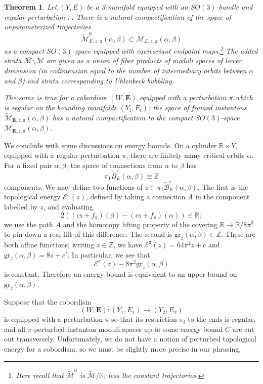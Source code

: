 \documentclass[10pt,a4paper]{amsart}
\newtheorem{theorem}{Theorem}
\theoremstyle{definition}
\theoremstyle{remark}
\numberwithin{figure}{qchap}
\begin{document}
\begin{theorem}\label{comp}Let $(Y,E)$ be a 3-manifold equipped with an $SO(3)$-bundle and regular perturbation $\pi$. There is a natural compactification of the space of unparameterized trajectories $$\widetilde{\mathcal M}^0_{E,z,\pi}(\alpha,\beta) \subset \overline{\mathcal M}_{E,z,\pi}(\alpha,\beta)$$ as a compact $SO(3)$-space equipped with equivariant endpoint maps.\footnote{Here recall that $\widetilde{\mathcal M}^0$ is $\widetilde{\mathcal M}/\mathbb R$, less the constant trajectories.} The added strata $\overline{\mathcal M} \setminus \widetilde{\mathcal M}$ are given as a union of fiber products of moduli spaces of lower dimension (in codimension equal to the number of intermediary orbits between $\alpha$ and $\beta$) and strata corresponding to Uhlenbeck bubbling.

The same is true for a cobordism $(W,\mathbf{E})$ equipped with a perturbation $\pi$ which is regular on the bounding manifolds $(Y_i, E_i)$: the space of framed instantons $\widetilde{\mathcal M}_{\mathbf{E},z,\pi}(\alpha, \beta)$ has a natural compactification to the compact $SO(3)$-space $\overline{\mathcal M}_{\mathbf{E},z,\pi}(\alpha, \beta)$.
\end{theorem}

We conclude with some discussions on energy bounds. On a cylinder $\mathbb R \times Y$, equipped with a regular perturbation $\pi$, there are finitely many critical orbits $\alpha$. For a fixed pair $\alpha, \beta$, the space of connections from $\alpha$ to $\beta$ has
$$\pi_1 \widetilde B^e_E(\alpha, \beta) \cong \mathbb Z$$
components. We may define two functions of $z \in \pi_1 \widetilde{\mathcal B}^e_E(\alpha, \beta)$. The first is the topological energy $\mathcal E^\pi(z)$, defined by taking a connection $A$ in the component labelled by $z$, and evaluating $$2\left((\text{cs}+f_\pi)(\beta)-(\text{cs}+f_\pi)(\alpha)\right) \in \mathbb R;$$ we use the path $A$ and the homotopy lifting property of the covering $\mathbb R \to \mathbb R/8\pi^2$ to pin down a real lift of this difference. The second is $\text{gr}_z(\alpha, \beta) \in \mathbb Z$. These are both affine functions; writing $z \in \mathbb Z$, we have $\mathcal E^\pi(z) = 64\pi^2 z + c$ and $\text{gr}_z(\alpha, \beta) = 8z + c'$. In particular, we see that
$$\mathcal E^\pi(z) - 8\pi^2\text{gr}_z(\alpha, \beta)$$
is constant. Therefore an energy bound is equivalent to an upper bound on $\text{gr}_z(\alpha, \beta)$.

Suppose that the cobordism
$$(W,\mathbf{E}): (Y_1, E_1) \to (Y_2, E_2)$$
is equipped with a perturbation $\pi$ so that its restriction $\pi_i$ to the ends is regular, and all $\pi$-perturbed instanton moduli spaces up to some energy bound $C$ are cut out transversely. Unfortunately, we do not have a notion of perturbed topological energy for a cobordism, so we must be slightly more precise in our phrasing.
\end{document}
